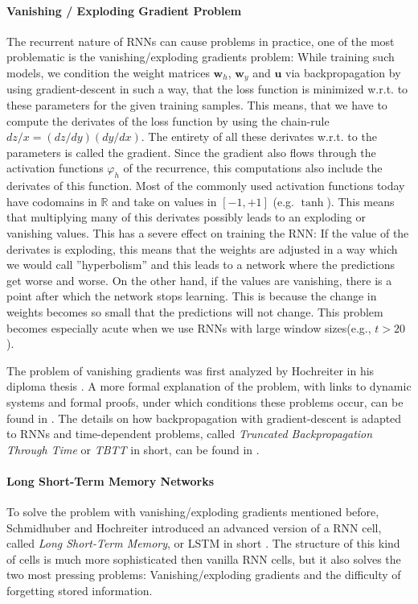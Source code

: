 \paragraph{Vanishing / Exploding Gradient Problem} The recurrent nature of RNNs can cause problems in practice, one of the most problematic is the vanishing/exploding gradients problem: While training such models, we condition the weight matrices $\mathbf{w}_h$, $\mathbf{w}_y$ and $\mathbf{u}$ via backpropagation by using gradient-descent in such a way, that the loss function is minimized w.r.t. to these parameters for the given training samples. This means, that we have to compute the derivates of the loss function by using the chain-rule $dz/x = (dz/dy)(dy/dx)$. The entirety of all these derivates w.r.t. to the parameters is called the gradient. Since the gradient also flows through the activation functions $\varphi_h$ of the recurrence, this computations also include the derivates of this function. Most of the commonly used activation functions today have codomains in $\mathbb{R}$ and take on values in $[-1, +1]$ (e.g. $\operatorname{tanh}$). This means that multiplying many of this derivates possibly leads to an exploding or vanishing values. This has a severe effect on training the RNN: If the value of the derivates is exploding, this means that the weights are adjusted in a way which we would call ''hyperbolism'' and this leads to a network where the predictions get worse and worse. On the other hand, if the values are vanishing, there is a point after which the network stops learning. This is because the change in weights becomes so small that the predictions will not change. This problem becomes especially acute when we use RNNs with large window sizes(e.g., $t > 20$).

The problem of vanishing gradients was first analyzed by Hochreiter in his diploma thesis \cite{Hochreiter:1991}. A more formal explanation of the problem, with links to dynamic systems and formal proofs, under which conditions these problems occur, can be found in \cite{Pascanu:2013}. The details on how backpropagation with gradient-descent is adapted to RNNs and time-dependent problems, called \emph{Truncated Backpropagation Through Time} or \emph{TBTT} in short, can be found in \cite{Werbos:1990}.

\paragraph{Long Short-Term Memory Networks} To solve the problem with vanishing/exploding gradients mentioned before, Schmidhuber and Hochreiter introduced an advanced version of a RNN cell, called \emph{Long Short-Term Memory}, or LSTM in short \cite{Hochreiter:1997}. The structure of this kind of cells is much more sophisticated then vanilla RNN cells, but it also solves the two most pressing problems: Vanishing/exploding gradients and the difficulty of forgetting stored information.

